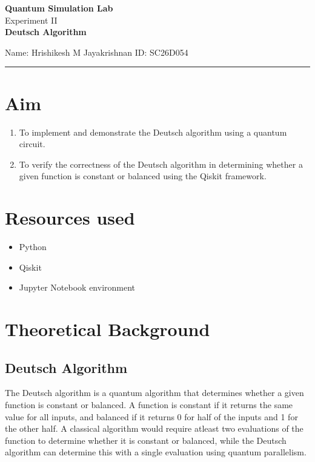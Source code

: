 \documentclass[12pt]{article}
\begin{document}
\begin{center}
    {\Large \textbf{Quantum Simulation Lab}} \\
    \vspace{0.8cm}
    {\Large Experiment II} \\
    \vspace{0.2cm}
    {\Large \textbf{Deutsch Algorithm}} \\
\end{center}

\vspace{0.5cm}
\noindent Name: Hrishikesh M Jayakrishnan \hfill ID: SC26D054
\vspace{1em}
\hrule

\vspace{1em}
\section{Aim}
\begin{enumerate}
    \item To implement and demonstrate the Deutsch algorithm using a quantum circuit.
    \item To verify the correctness of the Deutsch algorithm in determining whether a given function is constant or balanced using the Qiskit framework.
\end{enumerate}
\section{Resources used}
\begin{itemize}
    \item Python
    \item Qiskit 
    \item Jupyter Notebook environment
\end{itemize}

\section{Theoretical Background}
\subsection{Deutsch Algorithm}
The Deutsch algorithm is a quantum algorithm that determines whether a given function is constant or balanced. A function is constant if it returns the same value for all inputs, and balanced if it returns 0 for half of the inputs and 1 for the other half. A classical algorithm would require atleast two evaluations of the function to determine whether it is constant or balanced, while the Deutsch algorithm can determine this with a single evaluation using quantum parallelism.
\newpage
\end{document}

